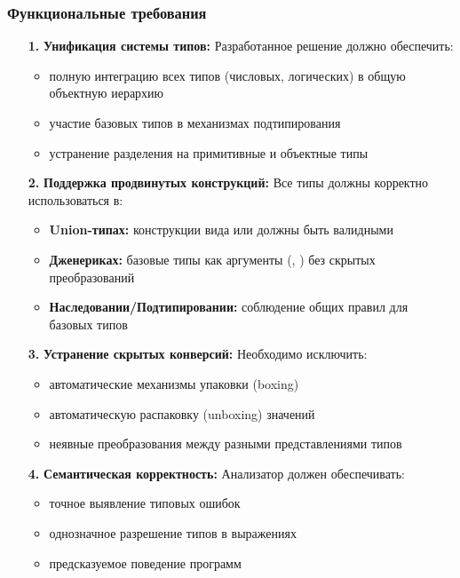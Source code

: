 \subsubsection{Функциональные требования}
\begin{enumerate}[leftmargin=*,align=left]
    \item[\textbf{1.}] \textbf{Унификация системы типов:} Разработанное решение должно обеспечить:
    \begin{itemize}
        \item полную интеграцию всех типов (числовых, логических) в общую объектную иерархию
        \item участие базовых типов в механизмах подтипирования
        \item устранение разделения на примитивные и объектные типы
    \end{itemize}

    \item[\textbf{2.}] \textbf{Поддержка продвинутых конструкций:} Все типы должны корректно использоваться в:
    \begin{itemize}
        \item \textbf{Union-типах:} конструкции вида  или  должны быть валидными
        \item \textbf{Дженериках:} базовые типы как аргументы (, ) без скрытых преобразований
        \item \textbf{Наследовании/Подтипировании:} соблюдение общих правил для базовых типов
    \end{itemize}

    \item[\textbf{3.}] \textbf{Устранение скрытых конверсий:} Необходимо исключить:
    \begin{itemize}
        \item автоматические механизмы упаковки (boxing)
        \item автоматическую распаковку (unboxing) значений
        \item неявные преобразования между разными представлениями типов
    \end{itemize}

    \item[\textbf{4.}] \textbf{Семантическая корректность:} Анализатор должен обеспечивать:
    \begin{itemize}
        \item точное выявление типовых ошибок
        \item однозначное разрешение типов в выражениях
        \item предсказуемое поведение программ
    \end{itemize}


\end{enumerate}
